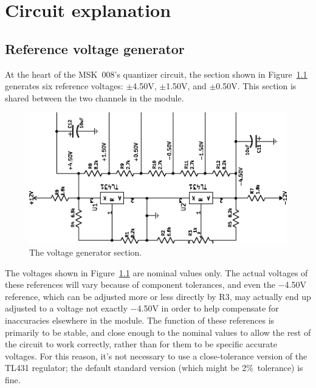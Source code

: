 
%
%
%
%
%
%

\chapter{Circuit explanation}

\section{Reference voltage generator}

At the heart of the MSK~008's quantizer circuit, the section shown in
Figure~\ref{fig:vgen} generates six reference voltages:  $\pm$4.50V,
$\pm$1.50V, and $\pm$0.50V.  This section is shared between the two channels
in the module.

\begin{figure}
\includegraphics[angle=-90]{vgen.eps}
\caption{The voltage generator section.}\label{fig:vgen}
\end{figure}

The voltages shown in Figure~\ref{fig:vgen} are nominal values only.  The
actual voltages of these references will vary because of component
tolerances, and even the $-$4.50V reference, which can be adjusted more or
less directly by R3, may actually end up adjusted to a voltage not exactly
$-$4.50V in order to help compensate for inaccuracies elsewhere in the
module.  The function of these references is primarily to be stable, and
close enough to the nominal values to allow the rest of the circuit to work
correctly, rather than for them to be specific accurate voltages.  For this
reason, it's not necessary to use a close-tolerance version of the TL431
regulator; the default standard version (which might be 2\%\ tolerance) is
fine.


